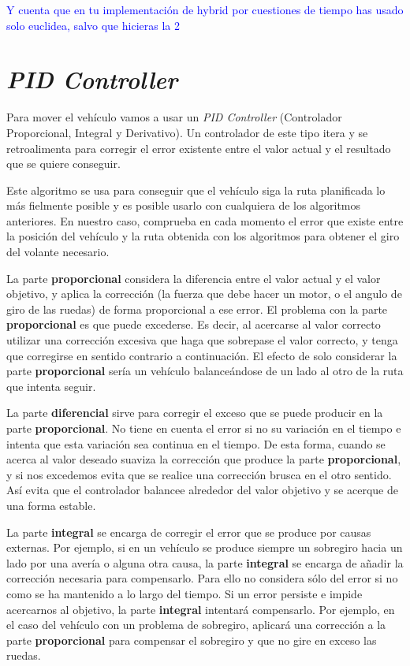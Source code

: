 \textcolor{blue}{Y cuenta que en tu implementación de hybrid por cuestiones de tiempo has usado solo euclidea, salvo que hicieras la 2}

\section{\textit{PID Controller}}\label{pidcontroller}
Para mover el vehículo vamos a usar un \textit{PID Controller} (Controlador Proporcional, Integral y Derivativo). Un controlador de este tipo itera y se retroalimenta para corregir el error existente entre el valor actual y el resultado que se quiere conseguir.

Este algoritmo se usa para conseguir que el vehículo siga la ruta planificada lo más fielmente posible y es posible usarlo con cualquiera de los algoritmos anteriores. En nuestro caso, comprueba en cada momento el error que existe entre la posición del vehículo y la ruta obtenida con los algoritmos para obtener el giro del volante necesario.

La parte \textbf{proporcional} considera la diferencia entre el valor actual y el valor objetivo, y aplica la corrección (la fuerza que debe hacer un motor, o el angulo de giro de las ruedas) de forma proporcional a ese error. El problema con la parte \textbf{proporcional} es que puede excederse. Es decir, al acercarse al valor correcto utilizar una corrección excesiva que haga que sobrepase el valor correcto, y tenga que corregirse en sentido contrario a continuación. El efecto de solo considerar la parte \textbf{proporcional} sería un vehículo balanceándose de un lado al otro de la ruta que intenta seguir.

La parte \textbf{diferencial} sirve para corregir el exceso que se puede producir en la parte \textbf{proporcional}. No tiene en cuenta el error si no su variación en el tiempo e intenta que esta variación sea continua en el tiempo. De esta forma, cuando se acerca al valor deseado suaviza la corrección que produce la parte \textbf{proporcional}, y si nos excedemos evita que se realice una corrección brusca en el otro sentido. Así evita que el controlador balancee alrededor del valor objetivo y se acerque de una forma estable.

La parte \textbf{integral} se encarga de corregir el error que se produce por causas externas. Por ejemplo, si en un vehículo se produce siempre un sobregiro hacia un lado por una avería o alguna otra causa, la parte \textbf{integral} se encarga de añadir la corrección necesaria para compensarlo. Para ello no considera sólo del error si no como se ha mantenido a lo largo del tiempo. Si un error persiste e impide acercarnos al objetivo, la parte \textbf{integral} intentará compensarlo. Por ejemplo, en el caso del vehículo con un problema de sobregiro, aplicará una corrección a la parte \textbf{proporcional} para compensar el sobregiro y que no gire en exceso las ruedas.

